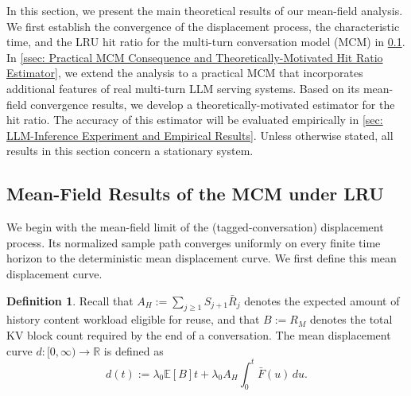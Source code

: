 \documentclass{article}
\theoremstyle{definition}
\newtheorem{definition}[definition]{Definition}
\newcommand{\E}{\mathbb E}
\begin{document}
In this section, we present the main theoretical results of our mean-field analysis. We first establish the convergence of the displacement process, the characteristic time, and the LRU hit ratio for the multi-turn conversation model (MCM) in \cref{ssec: Mean-Field Results of the MCM under LRU}. In \cref{ssec: Practical MCM Consequence and Theoretically-Motivated Hit Ratio Estimator}, we extend the analysis to a practical MCM that incorporates additional features of real multi-turn LLM serving systems. Based on its mean-field convergence results, we develop a theoretically-motivated estimator for the  hit ratio. The accuracy of this estimator will be evaluated empirically in \cref{sec: LLM-Inference Experiment and Empirical Results}. Unless otherwise stated, all results in this section concern a stationary system.


\subsection{Mean-Field Results of the MCM under LRU}
\label{ssec: Mean-Field Results of the MCM under LRU}


We begin with the mean-field limit of the (tagged-conversation) displacement process. Its normalized sample path converges uniformly on every finite time horizon to the deterministic mean displacement curve. We first define this mean displacement curve.

\begin{definition}
    \label{def: Mean displacement Curve}
    Recall that $A_H:=\sum_{j\geq1}S_{j+1}\bar R_j$ denotes the expected amount of history content workload eligible for reuse, and that $B:=R_M$ denotes the total KV block count required by the end of a conversation. The mean displacement curve $d:[0,\infty)\rightarrow\mathbb R$ is defined as
    \begin{equation}
    \label{equ: Mean Displacement Curve-1}
        d(t):=\lambda_0\E[B]t+\lambda_0 A_H\int_0^t\bar F(u)\,du.
    \end{equation}
\end{definition}
\end{document}
